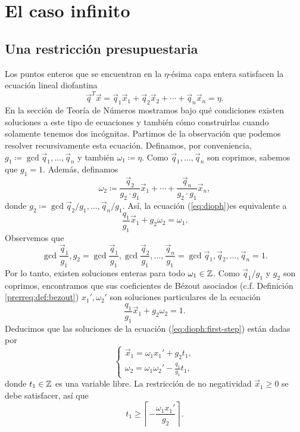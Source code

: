 \chapter{El caso infinito}


\section{Una restricción presupuestaria}
\noindent
Los puntos enteros que se encuentran en la $\eta$-ésima capa entera satisfacen la ecuación lineal
diofantina
\begin{equation}
	\label{eq:dioph}
	\vec{q}^T\vec{x} = \vec{q}_1\vec{x}_1 + \vec{q}_2\vec{x}_2 + \cdots + \vec{q}_n\vec{x}_n = \eta.
\end{equation}
En la sección de Teoría de Números mostramos bajo qué condiciones existen soluciones a este tipo de
ecuaciones y también cómo construirlas cuando solamente tenemos dos incógnitas. Partimos de la
observación que podemos resolver recursivamente esta ecuación. Definamos, por conveniencia,
$g_1 \coloneq \gcd{\vec{q}_1, \ldots, \vec{q}_n}$ y también $\omega_1 \coloneq \eta$. Como
$\vec{q}_1, \ldots, \vec{q}_n$ son coprimos, sabemos que $g_1 = 1$. Además, definamos
\begin{equation*}
	\omega_2 \coloneq \frac{\vec{q}_2}{g_2 \cdot g_1}\vec{x}_1 + \cdots + \frac{\vec{q}_n}{g_2 \cdot
	g_1}\vec{x}_n,
\end{equation*}
donde $g_2 \coloneq \gcd{\vec{q}_2/g_1, \ldots, \vec{q}_n/g_1}$. Así, la ecuación (\ref{eq:dioph})es
equivalente a
\begin{equation}
	\label{eq:dioph:first-step}
	\frac{q_1}{g_1}\vec{x}_1 + g_2\omega_2 = \omega_1.
\end{equation}
Observemos que
\begin{equation*}
	\gcd{\frac{\vec{q}_1}{g_1}, g_2}
	= \gcd{\frac{\vec{q}_1}{g_1}, \gcd{\frac{\vec{q}_2}{g_1}, \ldots, \frac{\vec{q}_n}{g_1}}}
	= \gcd{\vec{q}_1, \vec{q}_2, \ldots, \vec{q}_n} = 1.
\end{equation*}
Por lo tanto, existen soluciones enteras para todo $\omega_1 \in \mathbb{Z}$. Como $\vec{q}_1/g_1$ y $g_2$
son coprimos, encontramos que sus coeficientes de Bézout asociados (c.f. Definición
\ref{prerreq:def:bezout}) $x_1', \omega_2'$ son soluciones particulares de la ecuación
\begin{equation*}
	\frac{q_1}{g_1}\vec{x}_1 + g_2\omega_2 = 1.
\end{equation*}
Deducimos que las soluciones de la ecuación (\ref{eq:dioph:first-step}) están dadas por
\begin{equation*}
	\begin{cases}
		\vec{x}_1 = \omega_1x_1' + g_2t_1, \\
		\omega_2 = \omega_1\omega_2' - \frac{q_1}{g_1}t_1,
	\end{cases}
\end{equation*}
donde $t_1 \in \mathbb{Z}$ es una variable libre. La restricción de no negatividad $\vec{x}_1 \geq 0$ se debe
satisfacer, así que
\begin{equation*}
	t_1 \geq \left\lceil -\frac{\omega_1x_1'}{g_2} \right\rceil.
\end{equation*}

